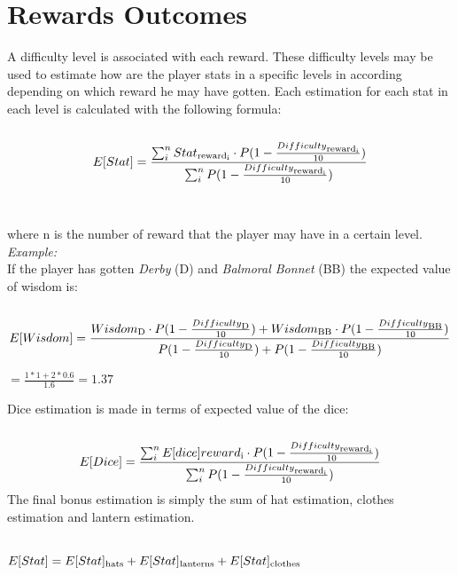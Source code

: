 \section{Rewards Outcomes}
A difficulty level is associated with each reward. These difficulty levels may be used to estimate how are the player stats in a specific levels in according depending on which reward he may have gotten. Each estimation for each stat in each level is calculated with the following formula: \\\\
\begin{equation}
  E[Stat]= \frac{\sum_{i}^{n} Stat\textsubscript{reward\textsubscript{i}}
  \cdot
  P(1-\frac{Difficulty\textsubscript{reward\textsubscript{i}}}{10})}
  {\sum_{i}^{n}P(1-\frac{Difficulty\textsubscript{reward\textsubscript{i}}}{10})}
\end{equation}
\\\\
where n is the number of reward that the player may have in a certain level.\\
\textit{Example:}\\
If the player has gotten \textit{Derby} (D) and \textit{Balmoral Bonnet} (BB) the expected value of wisdom is:\\\\
\begin{equation}
E[Wisdom]= \frac{Wisdom\textsubscript{D} \cdot P(1-\frac{Difficulty\textsubscript{D}}{10}) +
  Wisdom\textsubscript{BB} \cdot P(1-\frac{Difficulty\textsubscript{BB}}{10})}
{P(1-\frac{Difficulty\textsubscript{D}}{10})+P(1-\frac{Difficulty\textsubscript{BB}}{10})} 
\end{equation}
\begin{center}
  $= \frac{1*1 + 2*0.6}{1.6} =1.37$
  \end{center}

Dice estimation is made in terms of expected value of the dice:\\\\
\begin{equation}
  E[Dice]= \frac{\sum_{i}^{n} E[dice]{reward\textsubscript{i}}
  \cdot
  P(1-\frac{Difficulty\textsubscript{reward\textsubscript{i}}}{10})}
  {\sum_{i}^{n}P(1-\frac{Difficulty\textsubscript{reward\textsubscript{i}}}{10})}
\end{equation}
The final bonus estimation is simply the sum of hat estimation, clothes estimation and lantern estimation.\\\\
\begin{center}
  $E[Stat]=E[Stat]\textsubscript{hats} + E[Stat]\textsubscript{lanterns} + E[Stat]\textsubscript{clothes}$
  \end{center}


